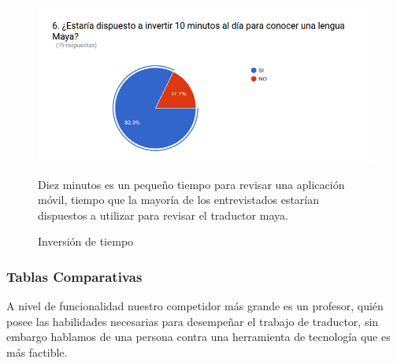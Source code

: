 \documentclass[a4paper,openright,11pt]{article}
\begin{document}
\begin{figure}
	\centering
	\includegraphics[width=1.0\textwidth]{e6}
	\caption{Inversión de tiempo}
	\label{fig:e6}
	Diez minutos es un pequeño tiempo para revisar una aplicación móvil, tiempo que la mayoría de los entrevistados estarían dispuestos a utilizar para revisar el traductor maya.
\end{figure}

\subsubsection{Tablas Comparativas}
\begin{table}[H]
\caption{Comparativa de Funcionalidades}
	A nivel de funcionalidad nuestro competidor más grande es un profesor, quién posee las habilidades necesarias para desempeñar el trabajo de traductor, sin embargo hablamos de una persona contra una herramienta de tecnología que es más factible.
\end{table}
\end{document}
